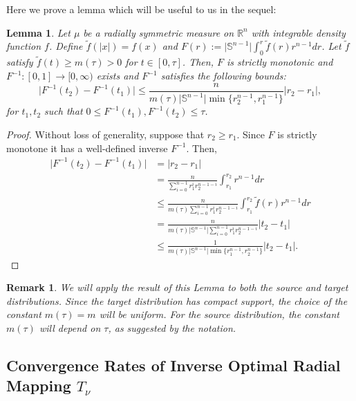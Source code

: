 \documentclass{amsart}
\theoremstyle{lemma}
\newtheorem{lemma}[theorem]{Lemma}
\newtheorem{remark}[theorem]{Remark}
\theoremstyle{remark}
\begin{document}
Here we prove a lemma which will be useful to us in the sequel:
\begin{lemma}\label{lemma:lipschitzinverse}
Let $\mu$ be a radially symmetric measure on $\mathbb{R}^n$ with integrable density function $f$. Define $\tilde{f}(\vert x \vert) = f(x)$ and $F(r) := \vert \mathbb{S}^{n-1} \vert \int_{0}^{r} \tilde{f}(r) r^{n-1}dr$. Let $\tilde{f}$ satisfy $\tilde{f}(t) \geq m(\tau)>0$ for $t \in [0, \tau]$. Then, $F$ is strictly monotonic and $F^{-1} : [0, 1] \rightarrow [0, \infty)$ exists and $F^{-1}$ satisfies the following bounds:
\begin{equation}
\vert F^{-1}(t_2) - F^{-1}(t_1) \vert \leq \frac{n}{m(\tau) \vert \mathbb{S}^{n-1} \vert \min \{ r_2^{n-1}, r_1^{n-1} \} } \vert r_2 - r_1 \vert,
\end{equation}
for $t_1, t_2$ such that $0 \leq F^{-1}(t_1), F^{-1}(t_2) \leq \tau$.
\end{lemma}
\begin{proof}
Without loss of generality, suppose that $r_2 \geq r_1$. Since $F$ is strictly monotone it has a well-defined inverse $F^{-1}$. Then,
\begin{align}
\vert F^{-1}(t_2) - F^{-1}(t_1)  \vert &= \vert r_2 - r_1 \vert \\
&= \frac{n}{\sum_{i=0}^{n-1} r_1^i r_2^{n-1-i}} \int_{r_1}^{r_2} r^{n-1}dr \\
&\leq \frac{n}{m(\tau) \sum_{i=0}^{n-1} r_1^i r_2^{n-1-i}} \int_{r_1}^{r_2} \tilde{f}(r) r^{n-1}dr \\
&= \frac{n}{m(\tau) \vert \mathbb{S}^{n-1} \vert \sum_{i=0}^{n-1} r_1^i r_2^{n-1-i}} \vert t_2 - t_1 \vert \\
&\leq \frac{1}{m(\tau) \vert \mathbb{S}^{n-1} \vert  \min \{r_1^{n-1}, r_2^{n-1} \} } \vert t_2 - t_1 \vert.
\end{align}
\end{proof}
\begin{remark}
We will apply the result of this Lemma to both the source and target distributions. Since the target distribution has compact support, the choice of the constant $m(\tau) = m$ will be uniform. For the source distribution, the constant $m(\tau)$ will depend on $\tau$, as suggested by the notation.
\end{remark}

\subsection{Convergence Rates of Inverse Optimal Radial Mapping $T_{\nu}$}\label{sec:radialmap}
\end{document}
